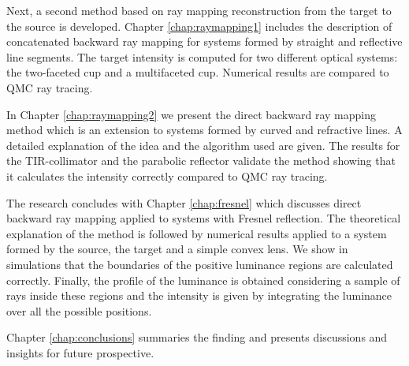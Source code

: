 Next, a second method based on ray mapping reconstruction from the target to the source is developed. Chapter \ref{chap:raymapping1} includes the description of concatenated backward ray mapping for systems formed by straight and reflective line segments. The target intensity is computed for two different optical systems: the two-faceted cup and a multifaceted cup. Numerical results are compared to QMC ray tracing. 

In Chapter \ref{chap:raymapping2} we present the direct backward ray mapping method which is an extension to systems formed by curved and refractive lines. A detailed explanation of the idea and the algorithm used are given. The results for the TIR-collimator and the parabolic reflector validate the method showing that it calculates the intensity correctly compared to QMC ray tracing. 

The research concludes with Chapter \ref{chap:fresnel} which discusses direct backward ray mapping applied to systems with Fresnel reflection. The theoretical explanation of the method is followed by numerical results applied to a system formed by the source, the target and a simple convex lens. We show in simulations that the boundaries of the positive luminance regions are calculated correctly. Finally, the profile of the luminance is obtained considering a sample of rays inside these regions and the intensity is given by integrating the luminance over all the possible positions. 

Chapter \ref{chap:conclusions} summaries the finding and presents discussions and insights for future prospective.
\clearpage{\pagestyle{empty}\cleardoublepage}
 